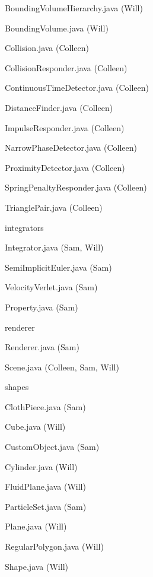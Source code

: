 \begin{description}
\begin{description}
\begin{description}
\begin{description}
      \item BoundingVolumeHierarchy.java (Will)
      \item BoundingVolume.java (Will)
      \item Collision.java (Colleen)
      \item CollisionResponder.java (Colleen)
      \item ContinuousTimeDetector.java (Colleen)
      \item DistanceFinder.java (Colleen)
      \item ImpulseResponder.java (Colleen)
      \item NarrowPhaseDetector.java (Colleen)
      \item ProximityDetector.java (Colleen)
      \item SpringPenaltyResponder.java (Colleen)
      \item TrianglePair.java (Colleen)
      \end{description}
    \item integrators
      \begin{description}
      \item Integrator.java (Sam, Will)
      \item SemiImplicitEuler.java (Sam)
      \item VelocityVerlet.java (Sam)
      \end{description}
    \item Property.java (Sam)
    \end{description}
  \item renderer
    \begin{description}
    \item Renderer.java (Sam)
    \end{description}
  \item Scene.java (Colleen, Sam, Will)
  \item shapes
    \begin{description}
    \item ClothPiece.java (Sam)
    \item Cube.java (Will)
    \item CustomObject.java (Sam)
    \item Cylinder.java (Will)
    \item FluidPlane.java (Will)
    \item ParticleSet.java (Sam)
    \item Plane.java (Will) 
    \item RegularPolygon.java (Will)
    \item Shape.java (Will)

\end{description}
\end{description}
\end{description}
